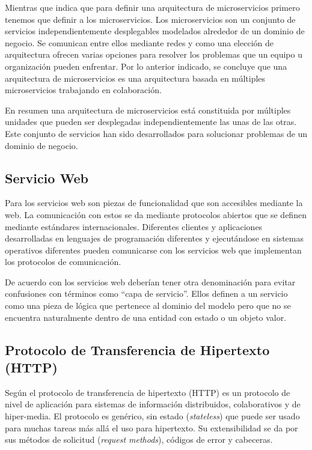 Mientras que \cite{newman2019monolith} indica que para definir una arquitectura de microservicios primero tenemos que
definir a los microservicios. Los microservicios son un conjunto de servicios independientemente
desplegables modelados alrededor de un dominio de negocio. Se comunican entre ellos mediante redes
y como una elección de arquitectura ofrecen varias opciones para resolver los problemas que un
equipo u organización pueden enfrentar. Por lo anterior indicado, se concluye que una arquitectura
de microservicios es una arquitectura basada en múltiples microservicios trabajando en colaboración.

En resumen una arquitectura de microservicios está constituida por múltiples unidades que pueden ser
desplegadas independientemente las unas de las otras. Este conjunto de servicios han sido desarrollados
para solucionar problemas de un dominio de negocio.


\subsection{Servicio Web}

Para \cite{bruijn2006web} los servicios web son piezas de funcionalidad que son accesibles mediante la web.
La comunicación con estos se da mediante protocolos abiertos que se definen mediante estándares internacionales.
Diferentes clientes y aplicaciones desarrolladas en lenguajes de programación diferentes y ejecutándose
en sistemas operativos diferentes pueden comunicarse con los servicios web que implementan
los protocolos de comunicación.

De acuerdo con \cite{percival2020architecture} los servicios web deberían tener otra denominación para evitar
confusiones con términos como ``capa de servicio''.
Ellos definen a un servicio como una pieza de lógica que pertenece al dominio del modelo pero que no se encuentra
naturalmente dentro de una entidad con estado o un objeto valor.


\subsection{Protocolo de Transferencia de Hipertexto (HTTP)}

Según \cite{goralski2017illustrated} el protocolo de transferencia de hipertexto (HTTP) es un protocolo de nivel de aplicación para sistemas de información
distribuidos, colaborativos y de hiper-media.
El protocolo es genérico, sin estado ({\it stateless}) que puede ser usado para muchas tareas más allá el uso para hipertexto.
Su extensibilidad se da por sus métodos de solicitud ({\it request methods}), códigos de error y cabeceras.

